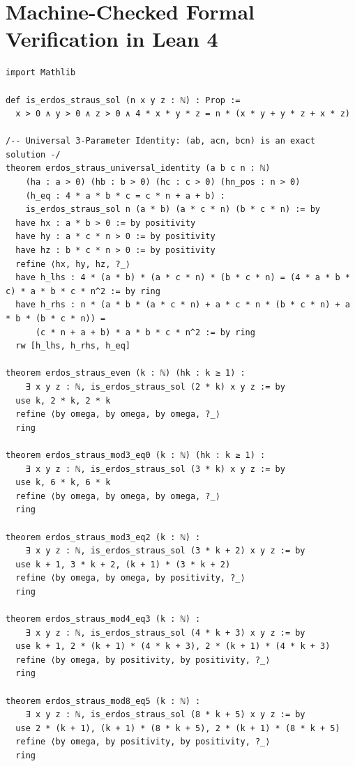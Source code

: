 \documentclass[11pt,a4paper]{article}
\theoremstyle{definition}
\begin{document}
\section{Machine-Checked Formal Verification in Lean 4}\label{sec:lean_formalization}

\begin{lstlisting}[caption={Certified Lean 4 Formalization of Erd\H{o}s-Straus Parameterizations}]
import Mathlib

def is_erdos_straus_sol (n x y z : ℕ) : Prop :=
  x > 0 ∧ y > 0 ∧ z > 0 ∧ 4 * x * y * z = n * (x * y + y * z + x * z)

/-- Universal 3-Parameter Identity: (ab, acn, bcn) is an exact solution -/
theorem erdos_straus_universal_identity (a b c n : ℕ)
    (ha : a > 0) (hb : b > 0) (hc : c > 0) (hn_pos : n > 0)
    (h_eq : 4 * a * b * c = c * n + a + b) :
    is_erdos_straus_sol n (a * b) (a * c * n) (b * c * n) := by
  have hx : a * b > 0 := by positivity
  have hy : a * c * n > 0 := by positivity
  have hz : b * c * n > 0 := by positivity
  refine ⟨hx, hy, hz, ?_⟩
  have h_lhs : 4 * (a * b) * (a * c * n) * (b * c * n) = (4 * a * b * c) * a * b * c * n^2 := by ring
  have h_rhs : n * (a * b * (a * c * n) + a * c * n * (b * c * n) + a * b * (b * c * n)) =
      (c * n + a + b) * a * b * c * n^2 := by ring
  rw [h_lhs, h_rhs, h_eq]

theorem erdos_straus_even (k : ℕ) (hk : k ≥ 1) :
    ∃ x y z : ℕ, is_erdos_straus_sol (2 * k) x y z := by
  use k, 2 * k, 2 * k
  refine ⟨by omega, by omega, by omega, ?_⟩
  ring

theorem erdos_straus_mod3_eq0 (k : ℕ) (hk : k ≥ 1) :
    ∃ x y z : ℕ, is_erdos_straus_sol (3 * k) x y z := by
  use k, 6 * k, 6 * k
  refine ⟨by omega, by omega, by omega, ?_⟩
  ring

theorem erdos_straus_mod3_eq2 (k : ℕ) :
    ∃ x y z : ℕ, is_erdos_straus_sol (3 * k + 2) x y z := by
  use k + 1, 3 * k + 2, (k + 1) * (3 * k + 2)
  refine ⟨by omega, by omega, by positivity, ?_⟩
  ring

theorem erdos_straus_mod4_eq3 (k : ℕ) :
    ∃ x y z : ℕ, is_erdos_straus_sol (4 * k + 3) x y z := by
  use k + 1, 2 * (k + 1) * (4 * k + 3), 2 * (k + 1) * (4 * k + 3)
  refine ⟨by omega, by positivity, by positivity, ?_⟩
  ring

theorem erdos_straus_mod8_eq5 (k : ℕ) :
    ∃ x y z : ℕ, is_erdos_straus_sol (8 * k + 5) x y z := by
  use 2 * (k + 1), (k + 1) * (8 * k + 5), 2 * (k + 1) * (8 * k + 5)
  refine ⟨by omega, by positivity, by positivity, ?_⟩
  ring


\end{lstlisting}
\end{document}
